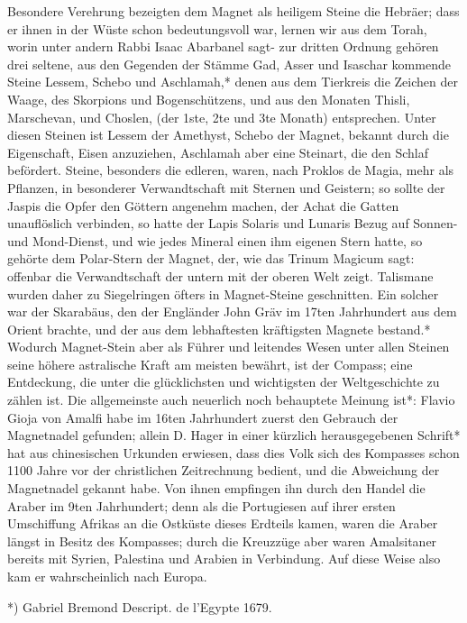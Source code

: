 \documentclass[a4paper, 11pt, oneside, polutonikogreek, german]{article}
\begin{document}
Besondere Verehrung bezeigten dem Magnet als heiligem Steine die Hebräer; dass er ihnen in der Wüste schon bedeutungsvoll war, lernen wir aus dem Torah, worin unter andern Rabbi Isaac Abarbanel sagt- zur dritten Ordnung gehören drei seltene, aus den Gegenden der Stämme Gad, Asser und Isaschar kommende Steine Lessem, Schebo und Aschlamah,* denen aus dem Tierkreis die Zeichen der Waage, des Skorpions und Bogenschützens, und aus den Monaten Thisli, Marschevan, und Choslen, (der 1ste, 2te und 3te Monath) entsprechen. Unter diesen Steinen ist Lessem der Amethyst, Schebo der Magnet, bekannt durch die Eigenschaft, Eisen anzuziehen, Aschlamah aber eine Steinart, die den Schlaf befördert. Steine, besonders die edleren, waren, nach Proklos de Magia, mehr als Pflanzen, in besonderer Verwandtschaft mit Sternen und Geistern; so sollte der Jaspis die Opfer den Göttern angenehm machen, der Achat die Gatten unauflöslich verbinden, so hatte der Lapis Solaris und Lunaris Bezug auf Sonnen- und Mond-Dienst, und wie jedes Mineral einen ihm eigenen Stern hatte, so gehörte dem Polar-Stern der Magnet, der, wie das Trinum Magicum sagt: offenbar die Verwandtschaft der untern mit der oberen Welt zeigt. Talismane wurden daher zu Siegelringen öfters in Magnet-Steine geschnitten. Ein solcher war der Skarabäus, den der Engländer John Gräv im 17ten Jahrhundert aus dem Orient brachte, und der aus dem lebhaftesten kräftigsten Magnete bestand.* Wodurch Magnet-Stein aber als Führer und leitendes Wesen unter allen Steinen seine höhere astralische Kraft am meisten bewährt, ist der Compass; eine Entdeckung, die unter die glücklichsten und wichtigsten der Weltgeschichte zu zählen ist. Die allgemeinste auch neuerlich noch behauptete Meinung ist*: Flavio Gioja von Amalfi habe im 16ten Jahrhundert zuerst den Gebrauch der Magnetnadel gefunden; allein D. Hager in einer kürzlich herausgegebenen Schrift* hat aus chinesischen Urkunden erwiesen, dass dies Volk sich des Kompasses schon 1100 Jahre vor der christlichen Zeitrechnung bedient, und die Abweichung der Magnetnadel gekannt habe. Von ihnen empfingen ihn durch den Handel die Araber im 9ten Jahrhundert; denn als die Portugiesen auf ihrer ersten Umschiffung Afrikas an die Ostküste dieses Erdteils kamen, waren die Araber längst in Besitz des Kompasses; durch die Kreuzzüge aber waren Amalsitaner bereits mit Syrien, Palestina und Arabien in Verbindung. Auf diese Weise also kam er wahrscheinlich nach Europa.

*) Gabriel Bremond Descript. de l'Egypte 1679.
\end{document}

